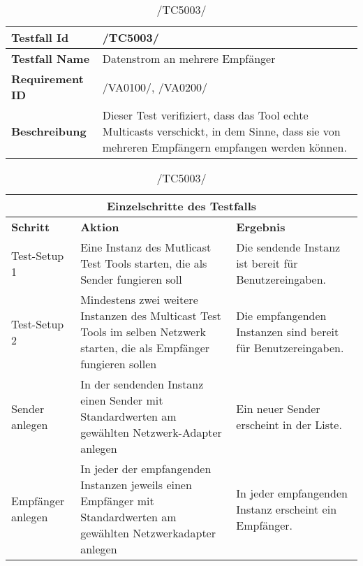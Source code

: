     \begin{table}[h]
        \caption{/TC5003/}
        \label{tab:TC5003}
        \begin{center}
            \begin{tabular}{|p{3.5cm}|p{12cm}|}
                \hline
                    \textbf{Testfall Id} & /TC5003/\\
                \hline
                    \textbf{Testfall Name} & Datenstrom an mehrere Empfänger\\
                \hline
                    \textbf{Requirement ID} & /VA0100/, /VA0200/\\
                \hline
                    \textbf{Beschreibung} & Dieser Test verifiziert, dass das
                    Tool echte Multicasts verschickt, in dem Sinne, dass sie
                    von mehreren Empfängern empfangen werden können.\\
                \hline
            \end{tabular}
            \begin{tabular}{|p{3.5cm}|p{5cm}|p{6.55cm}|}
                \multicolumn{3}{|c|}{\textbf{Einzelschritte des Testfalls}} \\
                \hline
                    \textbf{Schritt} & \textbf{Aktion} & \textbf{Ergebnis}\\
                \hline
                    Test-Setup 1 &
                    Eine Instanz des Mutlicast Test Tools
                    starten, die als Sender fungieren soll &
                    Die sendende Instanz ist bereit für Benutzereingaben. \\
                \hline
                    Test-Setup 2 & 
                    Mindestens zwei weitere Instanzen des Multicast Test Tools
                    im selben Netzwerk starten, die als Empfänger fungieren
                    sollen &
                    Die empfangenden Instanzen sind bereit für
                    Benutzereingaben.\\
                \hline
                    Sender anlegen &
                    In der sendenden Instanz einen Sender mit Standardwerten am
                    gewählten Netzwerk-Adapter anlegen &
                    Ein neuer Sender erscheint in der Liste.\\
                \hline
                    Empfänger anlegen &
                    In jeder der empfangenden Instanzen jeweils einen Empfänger
                    mit Standardwerten am gewählten Netzwerkadapter anlegen &
                    In jeder empfangenden Instanz erscheint ein Empfänger.\\

\end{tabular}
\end{center}
\end{table}
